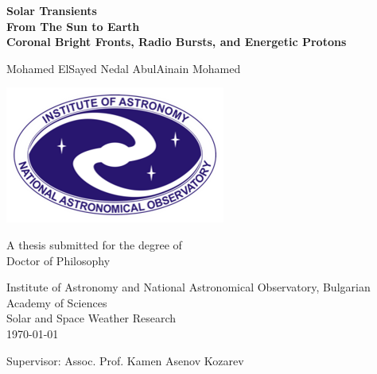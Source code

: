 \begin{titlepage}
    \begin{center}
        \vspace*{1cm}
        
        \Huge
        \textbf{Solar Transients\\From The Sun to Earth\\}
        \huge
        \textbf{Coronal Bright Fronts, Radio Bursts, and Energetic Protons}
        
        \vspace{1.5cm}
        
        \LARGE
        Mohamed ElSayed Nedal AbulAinain Mohamed
        
        \vfill
        \includegraphics[scale=0.7]{extras/ianao_logo.png}
        
        \vfill
        
        A thesis submitted for the degree of\\
        Doctor of Philosophy
        
        \vspace{0.8cm}
        
        \Large
        Institute of Astronomy and National Astronomical Observatory, Bulgarian Academy of Sciences\\
        Solar and Space Weather Research\\
        \today
        
        \vspace{0.8cm}
        
        Supervisor: Assoc. Prof. Kamen Asenov Kozarev
        
    \end{center}
\end{titlepage}
